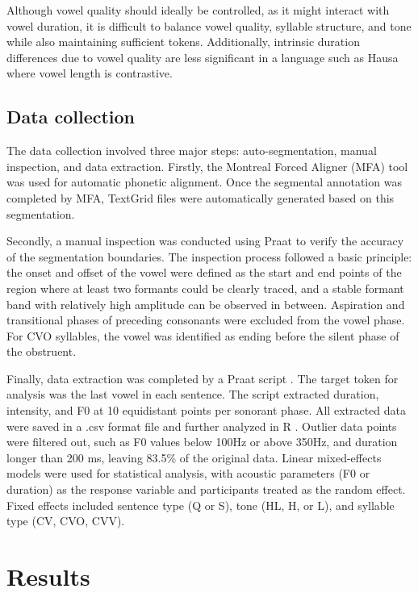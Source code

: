 \documentclass[output=paper,colorlinks,citecolor=brown
]{langscibook}
\begin{document}
Although vowel quality should ideally be controlled, as it might interact with vowel duration, it is difficult to balance vowel quality, syllable structure, and tone while also maintaining sufficient tokens. Additionally, intrinsic duration differences due to vowel quality are less significant in a language such as Hausa where vowel length is contrastive.

\subsection{Data collection}
The data collection involved three major steps: auto-segmentation, manual inspection, and data extraction. Firstly, the Montreal Forced Aligner (MFA) tool \citep{mfa} was used for automatic phonetic alignment. Once the segmental annotation was completed by MFA, TextGrid files were automatically generated based on this segmentation.

Secondly, a manual inspection was conducted using Praat \citep{praat2022} to verify the accuracy of the segmentation boundaries. The inspection process followed a basic principle: the onset and offset of the vowel were defined as the start and end points of the region where at least two formants could be clearly traced, and a stable formant band with relatively high amplitude can be observed in between. Aspiration and transitional phases of preceding consonants were excluded from the vowel phase. For CVO syllables, the vowel was identified as ending before the silent phase of the obstruent. 

Finally, data extraction was completed by a Praat script \citep{anja}. The target token for analysis was the last vowel in each sentence. The script extracted duration, intensity, and F0 at 10 equidistant points per sonorant phase. All extracted data were saved in a .csv format file and further analyzed in R \citep{rstudio}. Outlier data points were filtered out, such as F0 values below 100Hz or above 350Hz, and duration longer than 200 ms, leaving 83.5\% of the original data. Linear mixed-effects models were used for statistical analysis, with acoustic parameters (F0 or duration) as the response variable and participants treated as the random effect. Fixed effects included sentence type (Q or S), tone (HL, H, or L), and syllable type (CV, CVO, CVV).

\section{Results}
\end{document}
